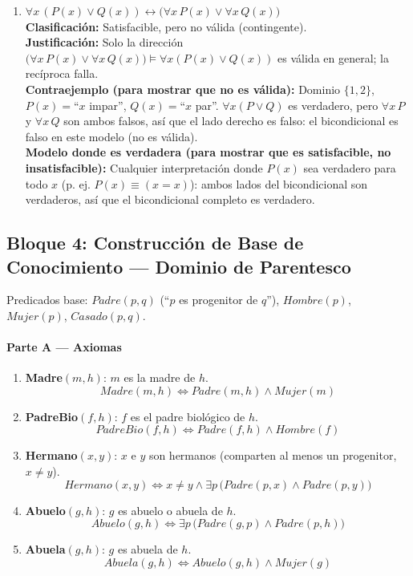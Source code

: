\begin{enumerate}
    \item[7.] $\forall x\,(P(x)\lor Q(x)) \leftrightarrow \big(\forall x\,P(x) \lor \forall x\,Q(x)\big)$\\
    \textbf{Clasificación:} Satisfacible, pero no válida (contingente).\\
    \textbf{Justificación:} Solo la dirección $\big(\forall x\,P(x)\lor\forall x\,Q(x)\big) \models
    \forall x(P(x)\lor Q(x))$ es válida en general; la recíproca falla.\\
    \textbf{Contraejemplo (para mostrar que no es válida):} Dominio $\{1,2\}$, $P(x)=$``$x$ impar'',
    $Q(x)=$``$x$ par''. $\forall x(P\lor Q)$ es verdadero, pero $\forall x\,P$ y $\forall x\,Q$ son
    ambos falsos, así que el lado derecho es falso: el bicondicional es falso en este modelo (no es
    válida).\\
    \textbf{Modelo donde es verdadera (para mostrar que es satisfacible, no insatisfacible):}
    Cualquier interpretación donde $P(x)$ sea verdadero para todo $x$ (p. ej. $P(x)\equiv(x{=}x)$):
    ambos lados del bicondicional son verdaderos, así que el bicondicional completo es verdadero.
\end{enumerate}

\subsection{Bloque 4: Construcción de Base de Conocimiento — Dominio de Parentesco}

Predicados base: $Padre(p,q)$ (``$p$ es progenitor de $q$''), $Hombre(p)$, $Mujer(p)$,
$Casado(p,q)$.

\paragraph{Parte A --- Axiomas}

\begin{enumerate}
    \item \textbf{Madre}$(m,h)$: $m$ es la madre de $h$.
    \[
        Madre(m,h) \Leftrightarrow Padre(m,h) \land Mujer(m)
    \]

    \item \textbf{PadreBio}$(f,h)$: $f$ es el padre biológico de $h$.
    \[
        PadreBio(f,h) \Leftrightarrow Padre(f,h) \land Hombre(f)
    \]

    \item \textbf{Hermano}$(x,y)$: $x$ e $y$ son hermanos (comparten al menos un progenitor, $x\neq
    y$).
    \[
        Hermano(x,y) \Leftrightarrow x\neq y \land \exists p\, \big(Padre(p,x) \land Padre(p,y)\big)
    \]

    \item \textbf{Abuelo}$(g,h)$: $g$ es abuelo o abuela de $h$.
    \[
        Abuelo(g,h) \Leftrightarrow \exists p\, \big(Padre(g,p) \land Padre(p,h)\big)
    \]

    \item \textbf{Abuela}$(g,h)$: $g$ es abuela de $h$.
    \[
        Abuela(g,h) \Leftrightarrow Abuelo(g,h) \land Mujer(g)
    \]
\end{enumerate}

